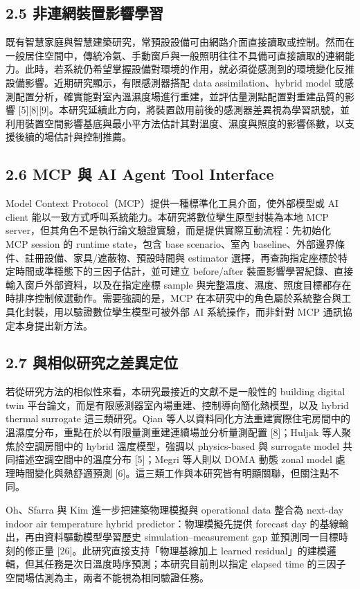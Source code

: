 \documentclass[12pt,a4paper]{article}
\begin{document}
\subsection*{2.5 非連網裝置影響學習}

既有智慧家庭與智慧建築研究，常預設設備可由網路介面直接讀取或控制。然而在一般居住空間中，傳統冷氣、手動窗戶與一般照明往往不具備可直接讀取的連網能力。此時，若系統仍希望掌握設備對環境的作用，就必須從感測到的環境變化反推設備影響。近期研究顯示，有限感測器搭配 data assimilation、hybrid model 或感測配置分析，確實能對室內溫濕度場進行重建，並評估量測點配置對重建品質的影響 [5][8][9]。本研究延續此方向，將裝置啟用前後的感測器差異視為學習訊號，並利用裝置空間影響基底與最小平方法估計其對溫度、濕度與照度的影響係數，以支援後續的場估計與控制推薦。


\subsection*{2.6 MCP 與 AI Agent Tool Interface}

Model Context Protocol（MCP）提供一種標準化工具介面，使外部模型或 AI client 能以一致方式呼叫系統能力。本研究將數位孿生原型封裝為本地 MCP server，但其角色不是執行論文驗證實驗，而是提供實際互動流程：先初始化 MCP session 的 runtime state，包含 base scenario、室內 baseline、外部邊界條件、註冊設備、家具/遮蔽物、預設時間與 estimator 選擇，再查詢指定座標於特定時間或準穩態下的三因子估計，並可建立 before/after 裝置影響學習紀錄、直接輸入窗戶外部資料，以及在指定座標 sample 與完整溫度、濕度、照度目標都存在時排序控制候選動作。需要強調的是，MCP 在本研究中的角色屬於系統整合與工具化封裝，用以驗證數位孿生模型可被外部 AI 系統操作，而非針對 MCP 通訊協定本身提出新方法。


\subsection*{2.7 與相似研究之差異定位}

若從研究方法的相似性來看，本研究最接近的文獻不是一般性的 building digital twin 平台論文，而是有限感測器室內場重建、控制導向簡化熱模型，以及 hybrid thermal surrogate 這三類研究。Qian 等人以資料同化方法重建實際住宅房間中的溫濕度分布，重點在於以有限量測重建連續場並分析量測配置 [8]；Huljak 等人聚焦於空調房間中的 hybrid 溫度模型，強調以 physics-based 與 surrogate model 共同描述空調空間中的溫度分布 [5]；Megri 等人則以 DOMA 動態 zonal model 處理時間變化與熱舒適預測 [6]。這三類工作與本研究皆有明顯關聯，但關注點不同。


Oh、Sfarra 與 Kim 進一步把建築物理模擬與 operational data 整合為 next-day indoor air temperature hybrid predictor：物理模擬先提供 forecast day 的基線輸出，再由資料驅動模型學習歷史 simulation--measurement gap 並預測同一目標時刻的修正量 [26]。此研究直接支持「物理基線加上 learned residual」的建模邏輯，但其任務是次日溫度時序預測；本研究目前則以指定 elapsed time 的三因子空間場估測為主，兩者不能視為相同驗證任務。
\end{document}
